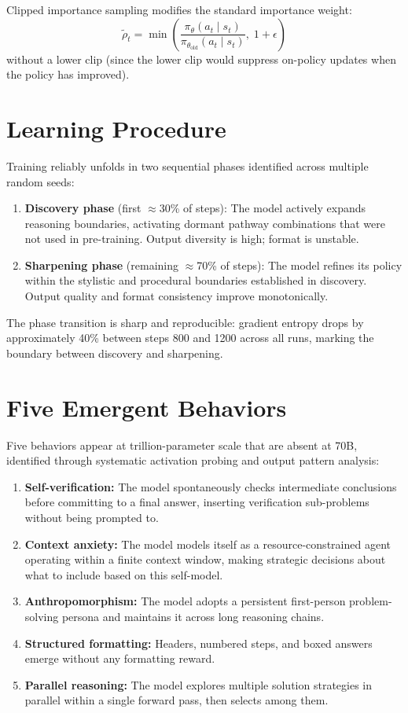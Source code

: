\documentclass[10pt,twocolumn]{article}
\begin{document}
Clipped importance sampling modifies the standard importance weight:
\[
\tilde{\rho}_t = \min\!\left(\frac{\pi_\theta(a_t \mid s_t)}{\pi_{\theta_{\text{old}}}(a_t \mid s_t)},\; 1 + \epsilon\right)
\]
without a lower clip (since the lower clip would suppress on-policy
updates when the policy has improved).

\section{Learning Procedure}

Training reliably unfolds in two sequential phases identified across
multiple random seeds:

\begin{enumerate}[itemsep=2pt,parsep=0pt]
  \item \textbf{Discovery phase} (first $\approx$30\% of steps):
    The model actively expands reasoning boundaries, activating
    dormant pathway combinations that were not used in pre-training.
    Output diversity is high; format is unstable.
  \item \textbf{Sharpening phase} (remaining $\approx$70\% of steps):
    The model refines its policy within the stylistic and
    procedural boundaries established in discovery. Output quality
    and format consistency improve monotonically.
\end{enumerate}

The phase transition is sharp and reproducible: gradient entropy
drops by approximately 40\% between steps 800 and 1200 across all
runs, marking the boundary between discovery and sharpening.

\section{Five Emergent Behaviors}

Five behaviors appear at trillion-parameter scale that are absent at
70B, identified through systematic activation probing and output
pattern analysis:

\begin{enumerate}[itemsep=2pt,parsep=0pt]
  \item \textbf{Self-verification:} The model spontaneously checks
    intermediate conclusions before committing to a final answer,
    inserting verification sub-problems without being prompted to.
  \item \textbf{Context anxiety:} The model models itself as a
    resource-constrained agent operating within a finite context
    window, making strategic decisions about what to include based
    on this self-model.
  \item \textbf{Anthropomorphism:} The model adopts a persistent
    first-person problem-solving persona and maintains it across
    long reasoning chains.
  \item \textbf{Structured formatting:} Headers, numbered steps,
    and boxed answers emerge without any formatting reward.
  \item \textbf{Parallel reasoning:} The model explores multiple
    solution strategies in parallel within a single forward pass,
    then selects among them.
\end{enumerate}
\end{document}
